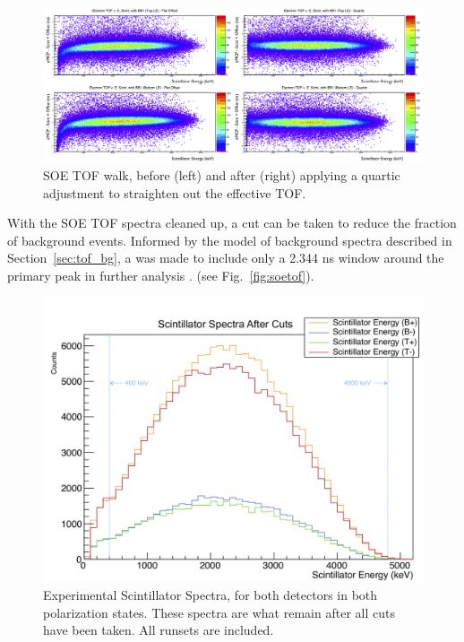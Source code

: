 \begin{figure}[h!!!!tb]
	\centering
	\includegraphics[width=.999\linewidth]
	{Figures/WalkAdjust.png}
	\caption{SOE TOF walk, before (left) and after (right) applying a quartic adjustment to straighten out the effective TOF.}	
	\label{fig:WalkAdjust}
\end{figure}

With the SOE TOF spectra cleaned up, a cut can be taken to reduce the fraction of background events.  Informed by the model of background spectra described in Section~\ref{sec:tof_bg}, a was made to include only a 2.344 ns window around the primary peak in further analysis . (see Fig.~\ref{fig:soetof}).




\begin{figure}[h!!!!tb]
	\centering
	\includegraphics[width=.999\linewidth]
	{Figures/experimental_scintspectra_lin.png}
	\caption[Experimental Scintillator Spectra]{Experimental Scintillator Spectra, for both detectors in both polarization states.  These spectra are what remain after all cuts have been taken.  All runsets are included.}	
	\label{fig:scintspectra}
\end{figure}





